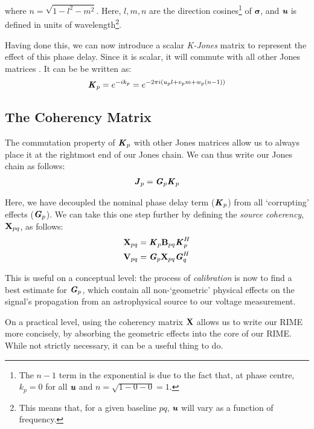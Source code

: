 where $n=\sqrt{1-l^2-m^2}$. Here, $l,m,n$ are the direction cosines\footnote{The $n-1$ term in the exponential is due to the fact that, at phase centre, $k_p=0$ for all $\emph{\textbf{u}}$ and $n=\sqrt{1-0-0}=1$.} of $\pmb{\sigma}$, and $\emph{\textbf{u}}$ is defined in units of wavelength\footnote{This means that, for a given baseline $pq$, $\emph{\textbf{u}}$ will vary as a function of frequency.}.

\pg 
Having done this, we can now introduce a scalar \emph{K-Jones} matrix to represent the effect of this phase delay. Since it is scalar, it will commute with all other Jones matrices . It can be be written as:
\begin{equation}
\textbf{\emph{K}}_p = e^{-i k_p}  = e^{-2\pi i ( u_p l + v_p m + w_p (n-1) )}
\end{equation}

\subsection{The Coherency Matrix}
\label{section.RIME.JonesChain.CoherencyMatrix}

\pg
The commutation property of $\textbf{\emph{K}}_p$ with other Jones matrices allow us to always place it at the rightmost end of our Jones chain. We can thus write our Jones chain as follows:
\begin{align}
\textbf{\emph{J}}_p  &= \textbf{\emph{G}}_p \textbf{\emph{K}}_p\\
\end{align}

\pg
Here, we have decoupled the nominal phase delay term ($\textbf{\emph{K}}_p$) from all `corrupting' effects ($\textbf{\emph{G}}_p$). We can take this one step further by defining the \emph{source coherency}, $\textbf{X}_{pq}$, as follows:
\begin{align}\label{eq.def.coherency}
\textbf{X}_{pq} &= \textbf{\emph{K}}_p \textbf{B}_{pq} \textbf{\emph{K}}_p^H\\
\textbf{V}_{pq} &= \textbf{\emph{G}}_p \textbf{X}_{pq} \textbf{\emph{G}}_q^H
\end{align}

\pg
This is useful on a conceptual level: the process of \emph{calibration} is now to find a best estimate for $\textbf{\emph{G}}_p$, which contain all non-`geometric' physical effects on the signal's propagation from an astrophysical source to our voltage measurement.

\pg
On a practical level, using the coherency matrix $\textbf{X}$ allows us to write our RIME more concisely, by absorbing the geometric effects into the core of our RIME. While not strictly necessary, it can be a useful thing to do.

